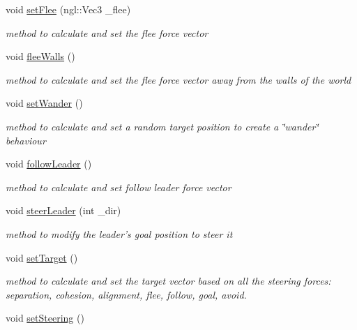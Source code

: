 \begin{DoxyCompactItemize}
void \hyperlink{classBoid_ac918331f40a49e19bcf13ee56e91d2b0}{setFlee} (ngl::Vec3 \_\-flee)
\begin{DoxyCompactList}\small\item\em method to calculate and set the flee force vector \item\end{DoxyCompactList}\item 
void \hyperlink{classBoid_a15072ed180111166238fe7b9022a93d3}{fleeWalls} ()
\begin{DoxyCompactList}\small\item\em method to calculate and set the flee force vector away from the walls of the world \item\end{DoxyCompactList}\item 
void \hyperlink{classBoid_a2ee1a9cb854d72bcd37941da6e542df3}{setWander} ()
\begin{DoxyCompactList}\small\item\em method to calculate and set a random target position to create a \char`\"{}wander\char`\"{} behaviour \item\end{DoxyCompactList}\item 
void \hyperlink{classBoid_a7b06459d98d91fba81f0976ab4a2c5db}{followLeader} ()
\begin{DoxyCompactList}\small\item\em method to calculate and set follow leader force vector \item\end{DoxyCompactList}\item 
void \hyperlink{classBoid_ade58ac3405f2cd75d2e3b76a53fd0737}{steerLeader} (int \_\-dir)
\begin{DoxyCompactList}\small\item\em method to modify the leader's goal position to steer it \item\end{DoxyCompactList}\item 
void \hyperlink{classBoid_aa1144dbf8050c06e5a89db5f84411dd6}{setTarget} ()
\begin{DoxyCompactList}\small\item\em method to calculate and set the target vector based on all the steering forces: separation, cohesion, alignment, flee, follow, goal, avoid. \item\end{DoxyCompactList}\item 
void \hyperlink{classBoid_aa2b619d85612051c88b2e7cc67ac0115}{setSteering} ()

\end{DoxyCompactItemize}
